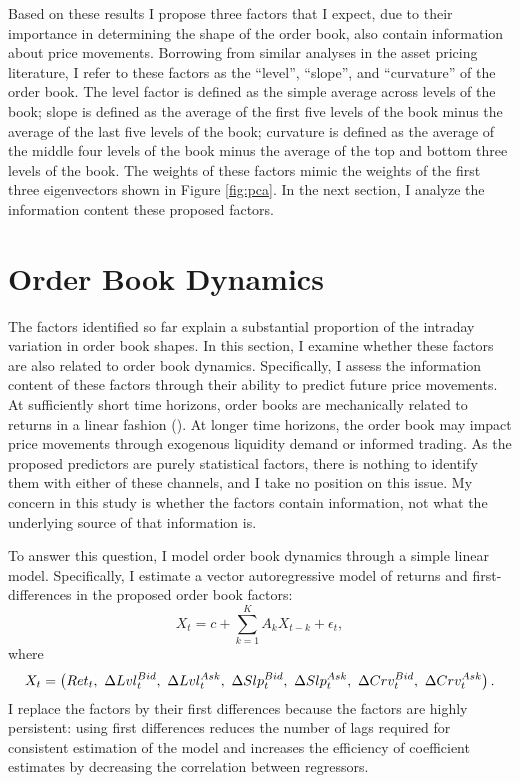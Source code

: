 Based on these results I propose three factors that I expect, due to their importance in determining the shape of the order book, also contain information about price movements. Borrowing from similar analyses in the asset pricing literature, I refer to these factors as the ``level'', ``slope'', and ``curvature'' of the order book. The level factor is defined as the simple average across levels of the book; slope is defined as the average of the first five levels of the book minus the average of the last five levels of the book; curvature is defined as the average of the middle four levels of the book minus the average of the top and bottom three levels of the book. The weights of these factors mimic the weights of the first three eigenvectors shown in Figure \ref{fig:pca}. In the next section, I analyze the information content these proposed factors.


\section{Order Book Dynamics}

The factors identified so far explain a substantial proportion of the intraday variation in order book shapes. In this section, I examine whether these factors are also related to order book dynamics. Specifically, I assess the information content of these factors through their ability to predict future price movements. At sufficiently short time horizons, order books are mechanically related to returns in a linear fashion (\citet{Cont2013B}). At longer time horizons, the order book may impact price movements through exogenous liquidity demand or informed trading. As the proposed predictors are purely statistical factors, there is nothing to identify them with either of these channels, and I take no position on this issue. My concern in this study is whether the factors contain information, not what the underlying source of that information is.

To answer this question, I model order book dynamics through a simple linear model. Specifically, I estimate a vector autoregressive model of returns and first-differences in the proposed order book factors:
%
\begin{equation}
\label{eqn:var}
X_t = c + \sum_{k=1}^{K} A_k X_{t-k} + \epsilon_t,
\end{equation}
%
where
%
\begin{equation}
X_t = \left( Ret_t, \ \Delta Lvl_t^{Bid}, \ \Delta Lvl_t^{Ask}, \ \Delta Slp_t^{Bid}, \ \Delta Slp_t^{Ask}, \ \Delta Crv_t^{Bid}, \ \Delta Crv_t^{Ask} \right). \notag
\end{equation}
%
I replace the factors by their first differences because the factors are highly persistent: using first differences reduces the number of lags required for consistent estimation of the model and increases the efficiency of coefficient estimates by decreasing the correlation between regressors.


